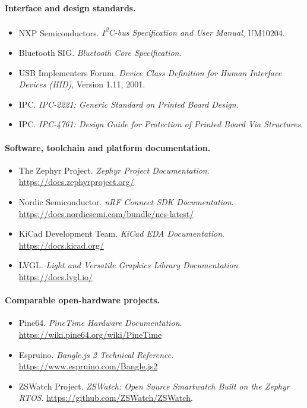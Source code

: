 \documentclass[12pt, a4paper]{article}
\begin{document}
\paragraph{Interface and design standards.}
\begin{itemize}\setlength{\itemsep}{2pt}
  \item NXP Semiconductors. \emph{I\textsuperscript{2}C-bus Specification and User Manual}, UM10204.
  \item Bluetooth SIG. \emph{Bluetooth Core Specification}.
  \item USB Implementers Forum. \emph{Device Class Definition for Human Interface Devices (HID)}, Version 1.11, 2001.
  \item IPC. \emph{IPC-2221: Generic Standard on Printed Board Design}.
  \item IPC. \emph{IPC-4761: Design Guide for Protection of Printed Board Via Structures}.
\end{itemize}

\paragraph{Software, toolchain and platform documentation.}
\begin{itemize}\setlength{\itemsep}{2pt}
  \item The Zephyr Project. \emph{Zephyr Project Documentation}. \url{https://docs.zephyrproject.org/}
  \item Nordic Semiconductor. \emph{nRF Connect SDK Documentation}. \url{https://docs.nordicsemi.com/bundle/ncs-latest/}
  \item KiCad Development Team. \emph{KiCad EDA Documentation}. \url{https://docs.kicad.org/}
  \item LVGL. \emph{Light and Versatile Graphics Library Documentation}. \url{https://docs.lvgl.io/}
\end{itemize}

\paragraph{Comparable open-hardware projects.}
\begin{itemize}\setlength{\itemsep}{2pt}
  \item Pine64. \emph{PineTime Hardware Documentation}. \url{https://wiki.pine64.org/wiki/PineTime}
  \item Espruino. \emph{Bangle.js 2 Technical Reference}. \url{https://www.espruino.com/Bangle.js2}
  \item ZSWatch Project. \emph{ZSWatch: Open Source Smartwatch Built on the Zephyr RTOS}. \url{https://github.com/ZSWatch/ZSWatch}.
\end{itemize}

\fussy
\end{document}
